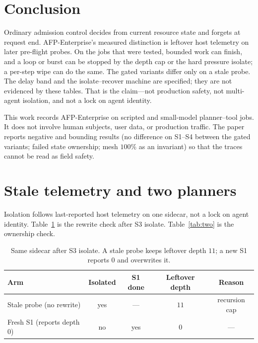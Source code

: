 \documentclass[11pt,a4paper]{article}
\begin{document}
\section{Conclusion}
\label{sec:conclusion}

Ordinary admission control decides from current resource state and forgets at request end.
AFP-Enterprise's measured distinction is leftover host telemetry on later pre-flight probes.
On the jobs that were tested, bounded work can finish, and a loop or burst can be stopped by the depth cap or the hard pressure isolate; a per-step wipe can do the same.
The gated variants differ only on a stale probe.
The delay band and the isolate--recover machine are specified; they are not evidenced by these tables.
That is the claim---not production safety, not multi-agent isolation, and not a lock on agent identity.

This work records AFP-Enterprise on scripted and small-model planner--tool jobs.
It does not involve human subjects, user data, or production traffic.
The paper reports negative and bounding results (no difference on S1--S4 between the gated variants; failed state ownership; mesh $100\%$ as an invariant) so that the traces cannot be read as field safety.



\appendix
\section{Stale telemetry and two planners}
\label{app:stale}

Isolation follows last-reported host telemetry on one sidecar, not a lock on agent identity.
Table~\ref{tab:persist} is the rewrite check after S3 isolate.
Table~\ref{tab:two} is the ownership check.

\begin{table}[htbp]
\centering
\caption{Same sidecar after S3 isolate. A stale probe keeps leftover depth $11$; a new S1 reports $0$ and overwrites it.}
\label{tab:persist}
\begin{tabular}{@{}lcccc@{}}
\toprule
Arm & Isolated & S1 done & Leftover depth & Reason \\
\midrule
Stale probe (no rewrite) & yes & --- & $11$ & recursion cap \\
Fresh S1 (reports depth $0$) & no & yes & $0$ & --- \\
\bottomrule
\end{tabular}
\end{table}
\end{document}
